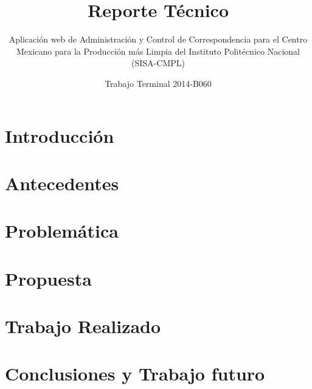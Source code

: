 \documentclass[oneside,10pt]{book}
\title{Reporte Técnico}
\subtitle{Aplicación web de Administración y Control de Correspondencia para el Centro Mexicano para la Producción más Limpia del Instituto Politécnico Nacional (SISA-CMPL)}
\author{Trabajo Terminal 2014-B060}
\begin{document}
\maketitle
\thispagestyle{empty}

\frontmatter
\tableofcontents

\mainmatter

\chapter{Introducción}


\chapter{Antecedentes}
	

\chapter{Problemática}


\chapter{Propuesta}


\chapter{Trabajo Realizado}


\chapter{Conclusiones y Trabajo futuro}



\end{document}
